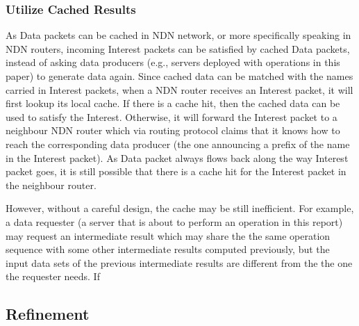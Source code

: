 \documentclass[journal]{IEEEtran}
\begin{document}
\subsubsection{Utilize Cached Results}
As {\sc Data} packets can be cached in NDN network, or more specifically
speaking in NDN routers, incoming {\sc Interest} packets can be satisfied by
cached {\sc Data} packets, instead of asking data producers (e.g., servers
deployed with operations in this paper) to generate data again.  Since cached
data can be matched with the names carried in {\sc Interest} packets, when a NDN
router receives an {\sc Interest} packet, it will first lookup its local cache.
If there is a cache hit, then the cached data can be used to satisfy the {\sc
  Interest}.  Otherwise, it will forward the {\sc Interest} packet to a
neighbour NDN router which via routing protocol claims that it knows how to
reach the corresponding data producer (the one announcing a prefix of the name
in the {\sc Interest} packet).  As {\sc Data} packet always flows back along the
way {\sc Interest} packet goes, it is still possible that there is a cache hit
for the {\sc Interest} packet in the neighbour router.  

However, without a careful design, the cache may be still inefficient.  For
example, a data requester (a server that is about to perform an operation in
this report) may request an intermediate result which may share the the same
operation sequence with some other intermediate results computed previously, but
the input data sets of the previous intermediate results are different from the
the one the requester needs.  If 


\subsection{Refinement}
\end{document}
